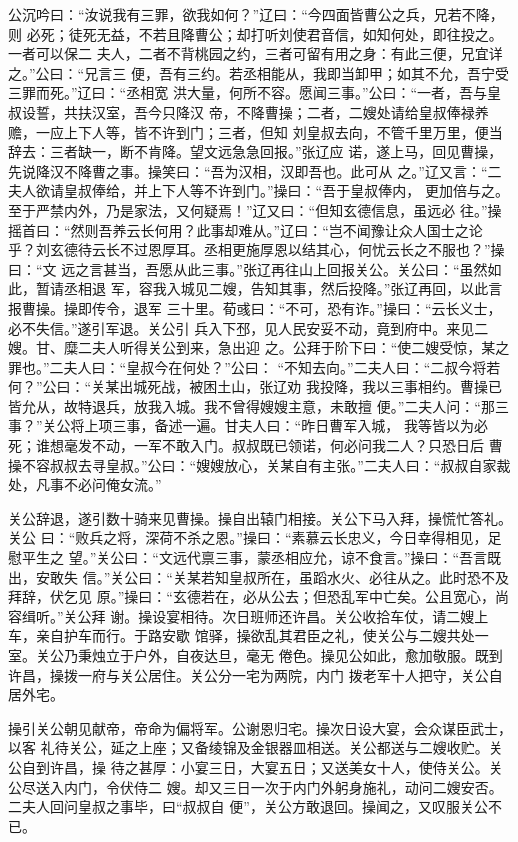 公沉吟曰：“汝说我有三罪，欲我如何？”辽曰：“今四面皆曹公之兵，兄若不降，则
必死；徒死无益，不若且降曹公；却打听刘使君音信，如知何处，即往投之。一者可以保二
夫人，二者不背桃园之约，三者可留有用之身：有此三便，兄宜详之。”公曰：“兄言三
便，吾有三约。若丞相能从，我即当卸甲；如其不允，吾宁受三罪而死。”辽曰：“丞相宽
洪大量，何所不容。愿闻三事。”公曰：“一者，吾与皇叔设誓，共扶汉室，吾今只降汉
帝，不降曹操；二者，二嫂处请给皇叔俸禄养赡，一应上下人等，皆不许到门；三者，但知
刘皇叔去向，不管千里万里，便当辞去：三者缺一，断不肯降。望文远急急回报。”张辽应
诺，遂上马，回见曹操，先说降汉不降曹之事。操笑曰：“吾为汉相，汉即吾也。此可从
之。”辽又言：“二夫人欲请皇叔俸给，并上下人等不许到门。”操曰：“吾于皇叔俸内，
更加倍与之。至于严禁内外，乃是家法，又何疑焉！”辽又曰：“但知玄德信息，虽远必
往。”操摇首曰：“然则吾养云长何用？此事却难从。”辽曰：“岂不闻豫让众人国士之论
乎？刘玄德待云长不过恩厚耳。丞相更施厚恩以结其心，何忧云长之不服也？”操曰：“文
远之言甚当，吾愿从此三事。”张辽再往山上回报关公。关公曰：“虽然如此，暂请丞相退
军，容我入城见二嫂，告知其事，然后投降。”张辽再回，以此言报曹操。操即传令，退军
三十里。荀彧曰：“不可，恐有诈。”操曰：“云长义士，必不失信。”遂引军退。关公引
兵入下邳，见人民安妥不动，竟到府中。来见二嫂。甘、糜二夫人听得关公到来，急出迎
之。公拜于阶下曰：“使二嫂受惊，某之罪也。”二夫人曰：“皇叔今在何处？”公曰：
“不知去向。”二夫人曰：“二叔今将若何？”公曰：“关某出城死战，被困土山，张辽劝
我投降，我以三事相约。曹操已皆允从，故特退兵，放我入城。我不曾得嫂嫂主意，未敢擅
便。”二夫人问：“那三事？”关公将上项三事，备述一遍。甘夫人曰：“昨日曹军入城，
我等皆以为必死；谁想毫发不动，一军不敢入门。叔叔既已领诺，何必问我二人？只恐日后
曹操不容叔叔去寻皇叔。”公曰：“嫂嫂放心，关某自有主张。”二夫人曰：“叔叔自家裁
处，凡事不必问俺女流。”

关公辞退，遂引数十骑来见曹操。操自出辕门相接。关公下马入拜，操慌忙答礼。关公
曰：“败兵之将，深荷不杀之恩。”操曰：“素慕云长忠义，今日幸得相见，足慰平生之
望。”关公曰：“文远代禀三事，蒙丞相应允，谅不食言。”操曰：“吾言既出，安敢失
信。”关公曰：“关某若知皇叔所在，虽蹈水火、必往从之。此时恐不及拜辞，伏乞见
原。”操曰：“玄德若在，必从公去；但恐乱军中亡矣。公且宽心，尚容缉听。”关公拜
谢。操设宴相待。次日班师还许昌。关公收拾车仗，请二嫂上车，亲自护车而行。于路安歇
馆驿，操欲乱其君臣之礼，使关公与二嫂共处一室。关公乃秉烛立于户外，自夜达旦，毫无
倦色。操见公如此，愈加敬服。既到许昌，操拨一府与关公居住。关公分一宅为两院，内门
拨老军十人把守，关公自居外宅。

操引关公朝见献帝，帝命为偏将军。公谢恩归宅。操次日设大宴，会众谋臣武士，以客
礼待关公，延之上座；又备绫锦及金银器皿相送。关公都送与二嫂收贮。关公自到许昌，操
待之甚厚：小宴三日，大宴五日；又送美女十人，使侍关公。关公尽送入内门，令伏侍二
嫂。却又三日一次于内门外躬身施礼，动问二嫂安否。二夫人回问皇叔之事毕，曰“叔叔自
便”，关公方敢退回。操闻之，又叹服关公不已。

